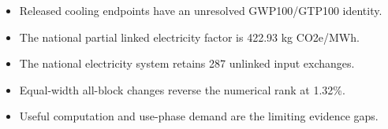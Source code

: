 \begin{itemize}
\item Released cooling endpoints have an unresolved GWP100/GTP100 identity.
\item The national partial linked electricity factor is 422.93 kg CO2e/MWh.
\item The national electricity system retains 287 unlinked input exchanges.
\item Equal-width all-block changes reverse the numerical rank at 1.32\%.
\item Useful computation and use-phase demand are the limiting evidence gaps.
\end{itemize}
